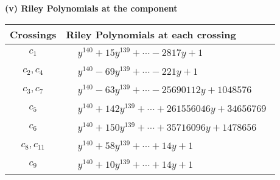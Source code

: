 \documentclass[1p]{elsarticle_modified}
\theoremstyle{definition}
\begin{document}
\newpage\renewcommand{\arraystretch}{1}
\flushleft \textbf{(v) Riley Polynomials at the component}\newline \\
\begin{tabular}{m{50pt}|m{274pt}}
Crossings & \hspace{64pt}Riley Polynomials at each crossing \\
\hline $$\begin{aligned}c_{1}\end{aligned}$$&$\begin{aligned}
&y^{140}+15 y^{139}+\cdots-2817 y+1
\end{aligned}$\\
\hline $$\begin{aligned}c_{2},c_{4}\end{aligned}$$&$\begin{aligned}
&y^{140}-69 y^{139}+\cdots-221 y+1
\end{aligned}$\\
\hline $$\begin{aligned}c_{3},c_{7}\end{aligned}$$&$\begin{aligned}
&y^{140}-63 y^{139}+\cdots-25690112 y+1048576
\end{aligned}$\\
\hline $$\begin{aligned}c_{5}\end{aligned}$$&$\begin{aligned}
&y^{140}+142 y^{139}+\cdots+261556046 y+34656769
\end{aligned}$\\
\hline $$\begin{aligned}c_{6}\end{aligned}$$&$\begin{aligned}
&y^{140}+150 y^{139}+\cdots+35716096 y+1478656
\end{aligned}$\\
\hline $$\begin{aligned}c_{8},c_{11}\end{aligned}$$&$\begin{aligned}
&y^{140}+58 y^{139}+\cdots+14 y+1
\end{aligned}$\\
\hline $$\begin{aligned}c_{9}\end{aligned}$$&$\begin{aligned}
&y^{140}+10 y^{139}+\cdots+14 y+1
\end{aligned}$\\

\end{tabular}
\end{document}
